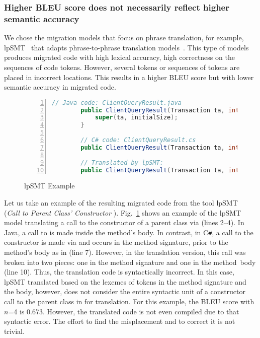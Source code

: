 \subsubsection{{\bf Higher BLEU score does not necessarily reflect higher semantic accuracy}}

We chose the migration models that focus on phrase translation, for
example, lpSMT~\cite{fse13-nier,karaivanov14} that adapts
phrase-to-phrase translation models~\cite{phrasal10}. This type of
models produces migrated code with high lexical accuracy, \ie high
correctness on the sequences of code tokens. However, several tokens
or sequences of tokens are placed in incorrect locations.  This
results in a higher BLEU score but with lower semantic accuracy in
migrated code.

\begin{figure}[t]
\centering
\begin{lstlisting}[basicstyle=\scriptsize\sffamily, stepnumber=1, numbers=left, language=Java, aboveskip=1pt,  belowskip=1pt, numbersep=-5pt]
		// Java code: ClientQueryResult.java
		public ClientQueryResult(Transaction ta, int initialSize){
			super(ta, initialSize);
		}

		// C# code: ClientQueryResult.cs
		public ClientQueryResult(Transaction ta, int initialSize) : base(ta, initialSize) {}

		// Translated by lpSMT:
		public ClientQueryResult(Transaction ta, int initialSize) : base(ta {, initialSize) ; }
\end{lstlisting}
\caption{lpSMT Example~\cite{fse13-nier}}
\label{fig:issueexample2}
\end{figure}


Let us take an example of the resulting migrated code from the tool
lpSMT~\cite{fse13-nier} ({\em Call to Parent Class' Constructor
  }). Fig.~\ref{fig:issueexample2} shows an example
of the lpSMT model translating a call to the constructor of a parent
class via  (lines 2--4). In Java, a call to  is
made inside the method's body. In contrast, in C\texttt{\#}, a call to the
constructor is made via  and occurs in the method
signature, \ie prior to the method's body as in
 (line 7). However, in the translation
version, this call was broken into two pieces: one in the method
signature  and one in the method~body\\  (line 10). Thus, the translation code is
syntactically incorrect. In this case, lpSMT translated based on the
lexemes of tokens in the method signature and the body, however, does
not consider the entire syntactic unit of a constructor call to the
parent class in  for translation. For this example, the
BLEU score with $n$=4 is 0.673. However, the translated code is not even
compiled due to that syntactic error. The effort to find the
misplacement and to correct it is not trivial.

